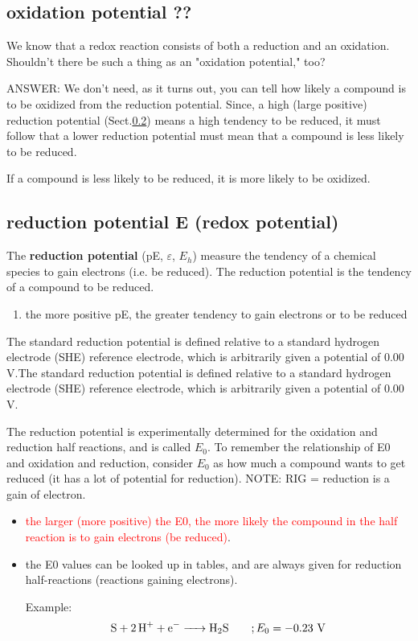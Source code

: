 \subsection{oxidation potential ??}


We know that a redox reaction consists of both a reduction and an oxidation.
Shouldn't there be such a thing as an "oxidation potential," too?

ANSWER: We don't need, as it turns out, you can tell how likely a compound is to
be oxidized from the reduction potential. Since, a high (large positive)
reduction potential (Sect.\ref{sec:reduction-potential}) means a high tendency
to be reduced, it must follow that a lower reduction potential must mean that a
compound is less likely to be reduced.

If a compound is less likely to be reduced, it is more likely to be oxidized.

\subsection{reduction potential E (redox potential)}
\label{sec:reduction-potential}
\label{sec:redox-potential}

The {\bf reduction potential}
(pE, $\varepsilon$, $E_h$) measure the tendency of a chemical species to gain
electrons (i.e. be reduced). The reduction potential is the tendency of a
compound to be reduced.
\begin{enumerate}
  \item the more positive pE, the greater tendency to gain electrons or to be
  reduced
\end{enumerate}

The standard reduction potential is defined relative to a standard hydrogen
electrode (SHE) reference electrode, which is arbitrarily given a potential of
0.00 V.The standard reduction potential is defined relative to a standard
hydrogen electrode (SHE) reference electrode, which is arbitrarily given a
potential of 0.00 V.


The reduction potential is experimentally determined for the oxidation and
reduction half reactions, and is called $E_0$.
To remember the relationship of E0 and oxidation and reduction, consider $E_0$
as how much a compound wants to get reduced (it has a lot of potential for
reduction). NOTE: RIG = reduction is a gain of electron.
\begin{itemize}

  \item  \textcolor{red}{the larger (more positive) the E0, the more likely the
  compound in the half reaction is to gain electrons (be reduced)}.

  \item the E0 values can be looked up in tables, and are always given for
  reduction half-reactions (reactions gaining electrons).

Example:
\begin{equation}
\ce{S + 2H^+ + e^- -> H2S } \qquad; E_0 = -0.23 \text{ V}
\end{equation}
\end{itemize}

